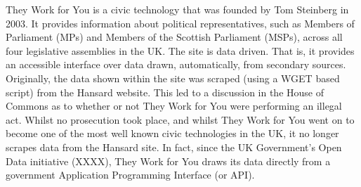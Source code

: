 They Work for You is a civic technology that was founded by Tom Steinberg in 2003.
It provides information about political representatives, such as Members of Parliament (MPs) and Members of the Scottish Parliament (MSPs), across all four legislative assemblies in the UK.
The site is data driven.
That is, it provides an accessible interface over data drawn, automatically, from secondary sources.
Originally, the data shown within the site was scraped (using a WGET based script) from the Hansard website.
This led to a discussion in the House of Commons as to whether or not They Work for You were performing an illegal act.
Whilst no prosecution took place, and whilst They Work for You went on to become one of the most well known civic technologies in the UK,
it no longer scrapes data from the Hansard site.
In fact, since the UK Government's Open Data initiative (XXXX), They Work for You draws its data directly from a government Application Programming Interface (or API).